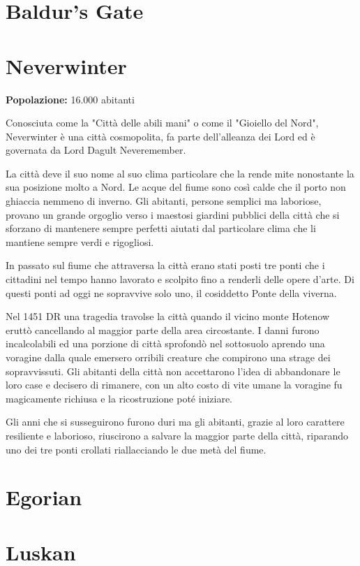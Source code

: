 \documentclass[letterpaper,twocolumn,openany,nodeprecatedcode]{dndbook}
\begin{document}
\section{Baldur's Gate}
\section{Neverwinter}
\textbf{Popolazione:} 16.000 abitanti

Conosciuta come la "Città delle abili mani" o come il "Gioiello del Nord", Neverwinter è una città cosmopolita, fa parte dell'alleanza dei Lord ed è governata da Lord Dagult Neveremember.

La città deve il suo nome al suo clima particolare che la rende mite nonostante la sua posizione molto a Nord. Le acque del fiume sono così calde che il porto non ghiaccia nemmeno di inverno. Gli abitanti, persone semplici ma laboriose, provano un grande orgoglio verso i maestosi giardini pubblici della città che si sforzano di mantenere sempre perfetti aiutati dal particolare clima che li mantiene sempre verdi e rigogliosi.

In passato sul fiume che attraversa la città erano stati posti tre ponti che i cittadini nel tempo hanno lavorato e scolpito fino a renderli delle opere d'arte. Di questi ponti ad oggi ne sopravvive solo uno, il cosiddetto Ponte della viverna.

Nel 1451 DR una tragedia travolse la città quando il vicino monte Hotenow eruttò cancellando al maggior parte della area circostante. I danni furono incalcolabili ed una porzione di città sprofondò nel sottosuolo aprendo una voragine dalla quale emersero orribili creature che compirono una strage dei sopravvissuti.
Gli abitanti della città non accettarono l'idea di abbandonare le loro case e decisero di rimanere, con un alto costo di vite umane la voragine fu magicamente richiusa e la ricostruzione poté iniziare.

Gli anni che si susseguirono furono duri ma gli abitanti, grazie al loro carattere resiliente e laborioso, riuscirono a salvare la maggior parte della città, riparando uno dei tre ponti crollati riallacciando le due metà del fiume.


\section{Egorian}
\section{Luskan}
\end{document}
